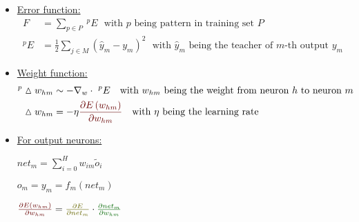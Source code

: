 \documentclass[10pt, a4paper]{article}
\begin{document}
\begin{itemize}
\begin{comment}
    \node[] (Y-4) at (2*\layersep,-4 cm) {$\vdots$};

    \node[output neuron,pin={[pin edge={->}]right:$y_M$}] (Y-5) at (2*\layersep,-5 cm) {};

    \foreach \source in {1,...,3}
        \foreach \dest in {1,...,5}
            \path (I-\source) edge (H-\dest);

    \foreach \source in {5,...,5}
        \foreach \dest in {1,...,5}
            \path (I-\source) edge (H-\dest);

    \foreach \source in {1,...,5}
        \foreach \dest in {1,...,3,5}
	    \path (H-\source) edge (Y-\dest);

    \node[annot,above of=H-1, node distance=1cm] (hl) {Hidden layer};
    \node[annot,left of=hl] {Input layer};
    \node[annot,right of=hl] {Output layer};
\end{tikzpicture}

\end{comment}

\item[]
\underline{Error function:}
\begin{align*}
F &= \sum_{p \in P} \ ^pE \ \ \ \text{with $p$ being pattern in training set $P$} \\
^p E &= \frac{1}{2} \sum_{j \in M} \left(\hat{y}_m - y_m \right)^2 \ \ \ \text{with $\hat{y}_m$ being the teacher of $m$-th output $y_m$}
\end{align*}

\item[]
\underline{Weight function:}
\begin{align*}
^p \vartriangle w_{hm} &\sim - \nabla_w \cdot \ ^p E \ \ \ \text{with $w_{hm}$ being the weight from neuron $h$ to neuron $m$} \\
\vartriangle w_{hm} &= - \eta \textcolor{red}{\frac{\partial E \left( w_{hm} \right) }{ \partial w_{hm}} } \ \ \ \text{with $\eta$ being the learning rate}
\end{align*}

\item[]
\underline{For output neurons:}

$net_m = \sum_{i=0}^H w_{im} \tilde{o}_i$

$o_m = y_m = f_m(net_m) $

$ \textcolor{red}{\frac{\partial E \left( w_{hm} \right) }{ \partial w_{hm} }} = \textcolor{magenta}{\frac{\partial E }{ \partial net_m }} \cdot \textcolor{green}{\frac{ \partial net_m }{ \partial w_{hm} }}$


\end{itemize}
\end{document}

